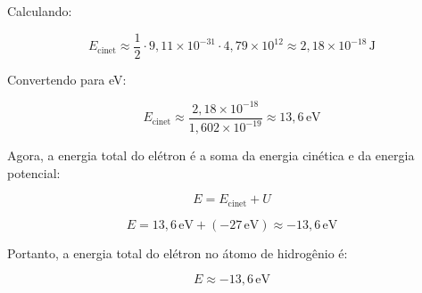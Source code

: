 \documentclass[a4paper,12pt]{article}
\begin{document}
\begin{flushleft}
Calculando:

\begin{equation}
E_{\text{cinet}} \approx \frac{1}{2} \cdot 9,11 \times 10^{-31} \cdot 4,79 \times 10^{12} \approx 2,18 \times 10^{-18} \, \text{J}
\end{equation}

Convertendo para eV:

\begin{equation}
E_{\text{cinet}} \approx \frac{2,18 \times 10^{-18}}{1,602 \times 10^{-19}} \approx 13,6 \, \text{eV}
\end{equation}

Agora, a energia total do elétron é a soma da energia cinética e da energia potencial:

\begin{equation}
E = E_{\text{cinet}} + U
\end{equation}

\begin{equation}
E = 13,6 \, \text{eV} + (-27 \, \text{eV}) \approx -13,6 \, \text{eV}
\end{equation}

Portanto, a energia total do elétron no átomo de hidrogênio é:

\begin{equation}
\boxed{E \approx -13,6 \, \text{eV}}
\end{equation}
\end{flushleft}
\end{document}
